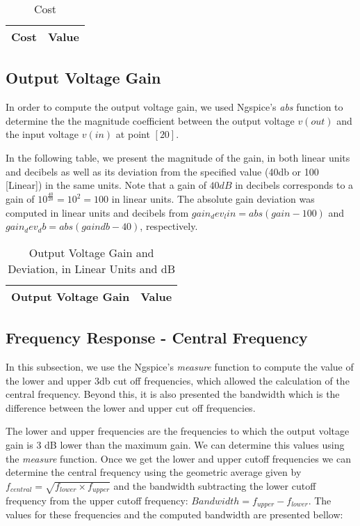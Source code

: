 \begin{table}[H]
  \centering
  \begin{tabular}{ |l|r| } 
    \hline    
    {\bf Cost} & {\bf Value} \\ \hline
    
  \end{tabular}
  \caption{Cost}
  \label{tab:cost}
\end{table}


\subsection{Output Voltage Gain}
\label{output_gain}
\par In order to compute the output voltage gain, we used Ngspice's \textit{abs} function to determine the the magnitude coefficient between the output voltage $v(out)$ and the input voltage $v(in)$ at point $[20]$.

 \par In the following table, we present the magnitude of the gain, in both linear units and decibels as well as its deviation from the specified value (40db or 100 [Linear]) in the same units.
 Note that a gain of $40dB$ in decibels corresponds to a gain of $10^{\frac{40}{20}}=10^2=100$ in linear units.
 The absolute gain deviation was computed in linear units and decibels from $gain_dev_lin= abs(gain-100)$ and $gain_dev_db = abs(gaindb-40)$, respectively. 
 
\begin{table}[H]
  \centering
  \begin{tabular}{|l|r|}
    \hline    
    {\bf Output Voltage Gain} & {\bf Value} \\ \hline
    
  \end{tabular}
  \caption{Output Voltage Gain and Deviation, in Linear Units and dB}
  \label{tab:gain}
\end{table}



\subsection{Frequency Response - Central Frequency}
\label{frequency_response}
\par In this subsection, we use the Ngspice's \textit{measure} function to compute the value of the lower and upper 3db cut off frequencies, which allowed the calculation of the central frequency. Beyond this, it is also presented the bandwidth which is the difference between the lower and upper cut off frequencies.
\par The lower and upper frequencies are the frequencies to which the output voltage gain is 3 dB lower than the maximum gain. We can determine this values using the \textit{measure} function. Once we get the lower and upper cutoff frequencies we can determine the central frequency using the geometric average given by $f_{central}=\sqrt{f_{lower}\times f_{upper}}$ and the bandwidth subtracting the lower cutoff frequency from the upper cutoff frequency: $Bandwidth = f_{upper}-f_{lower}$.
The values for these frequencies and the computed bandwidth are presented bellow:

